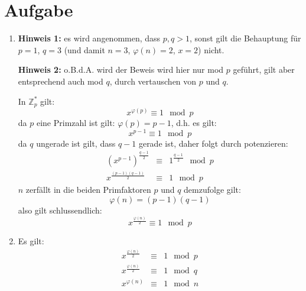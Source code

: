 \documentclass[DIN, pagenumber=false, fontsize=11pt, parskip=half]{scrartcl}
\begin{document}
    \section{Aufgabe}
    \begin{enumerate}[label=(\roman*)]
        \item 
            \textbf{Hinweis 1:} es wird angenommen, dass $p, q > 1$, 
            sonst gilt die Behauptung für $p=1$, $q=3$ 
            (und damit $n=3$, $\varphi(n)=2$, $x=2$) nicht.

        
            \textbf{Hinweis 2:} o.B.d.A. wird der Beweis wird hier nur mod $p$ geführt,
            gilt aber entsprechend auch mod $q$, durch vertauschen von $p$ und $q$.

            In $\mathbb{Z}^*_p$ gilt:
            \begin{equation}
                x^{\varphi(p)} \equiv 1 \mod p
            \end{equation}
            da $p$ eine Primzahl ist gilt: $\varphi(p) = p-1$,
            d.h. es gilt: 
            \begin{equation}
                x^{p-1} \equiv 1 \mod p
            \end{equation}
            da $q$ ungerade ist gilt, dass $q-1$ gerade ist, daher folgt
            durch potenzieren:
            \begin{eqnarray}
                {\left(x^{p-1}\right)}^{\frac{q-1}{2}} &\equiv& 1^{\frac{q-1}{2}} \mod p \\
                x^{\frac{(p-1)(q-1)}{2}} &\equiv& 1 \mod p
            \end{eqnarray}
            $n$ zerfällt in die beiden Primfaktoren $p$ und $q$ demzufolge gilt:
            \begin{equation}
                \varphi(n) = (p-1)(q-1)
            \end{equation}
            also gilt schlussendlich:
            \begin{equation}
                x^{\frac{\varphi(n)}{2}} \equiv 1 \mod p
            \end{equation}
        \item 
            Es gilt:
            \begin{eqnarray}
                x^{\frac{\varphi(n)}{2}} &\equiv& 1 \mod p \\
                x^{\frac{\varphi(n)}{2}} &\equiv& 1 \mod q \\
                x^{\varphi(n)} &\equiv& 1 \mod n
            \end{eqnarray}

\end{enumerate}
\end{document}
